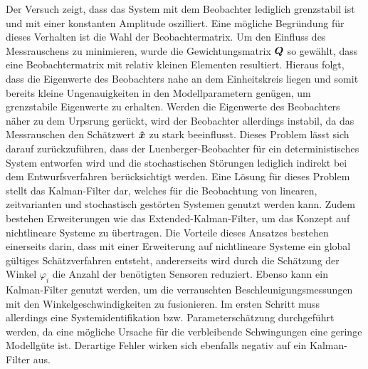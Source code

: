 Der Versuch zeigt, dass das System mit dem Beobachter lediglich grenzstabil ist und mit einer konstanten Amplitude oszilliert. Eine mögliche Begründung für dieses Verhalten ist die Wahl der Beobachtermatrix. Um den Einfluss des Messrauschens zu minimieren, wurde die Gewichtungsmatrix $\boldsymbol{Q}$ so gewählt, dass eine Beobachtermatrix mit relativ kleinen Elementen resultiert. Hieraus folgt, dass die Eigenwerte des Beobachters nahe an dem Einheitskreis liegen und somit bereits kleine Ungenauigkeiten in den Modellparametern genügen, um grenzstabile Eigenwerte zu erhalten. Werden die Eigenwerte des Beobachters näher zu dem Urpsrung gerückt, wird der Beobachter allerdings instabil, da das Messrauschen den Schätzwert $\boldsymbol{\hat{x}}$ zu stark beeinflusst. Dieses Problem lässt sich darauf zurückzuführen, dass der Luenberger-Beobachter für ein deterministisches System entworfen wird und die stochastischen Störungen lediglich indirekt bei dem Entwurfsverfahren berücksichtigt werden. Eine Lösung für dieses Problem stellt das Kalman-Filter dar, welches für die Beobachtung von linearen, zeitvarianten und stochastisch gestörten Systemen genutzt werden kann. Zudem bestehen Erweiterungen wie das Extended-Kalman-Filter, um das Konzept auf nichtlineare Systeme zu übertragen. 
Die Vorteile dieses Ansatzes bestehen einerseits darin, dass mit einer Erweiterung auf nichtlineare Systeme ein global gültiges Schätzverfahren entsteht, andererseits wird durch die Schätzung der Winkel $\varphi_i$ die Anzahl der benötigten Sensoren reduziert. Ebenso kann ein Kalman-Filter genutzt werden, um die verrauschten Beschleunigungsmessungen mit den Winkelgeschwindigkeiten zu fusionieren. Im ersten Schritt muss allerdings eine Systemidentifikation bzw. Parameterschätzung durchgeführt werden, da eine mögliche Ursache für die verbleibende Schwingungen eine geringe Modellgüte ist. Derartige Fehler wirken sich ebenfalls negativ auf ein Kalman-Filter aus.